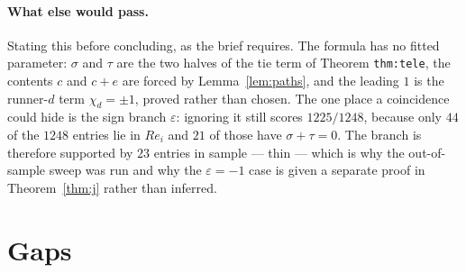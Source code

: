 \documentclass[11pt]{article}
\theoremstyle{definition}
\theoremstyle{remark}
\begin{document}
\paragraph{What else would pass.} Stating this before concluding, as the brief requires.
The formula has no fitted parameter: $\sigma$ and $\tau$ are the two halves of the tie
term of Theorem \texttt{thm:tele}, the contents $c$ and $c+e$ are forced by
Lemma~\ref{lem:paths}, and the leading $1$ is the runner-$d$ term $\chi_d=\pm1$, proved
rather than chosen. The one place a coincidence could hide is the sign branch
$\varepsilon$: ignoring it still scores $1225/1248$, because only $44$ of the $1248$
entries lie in $Re_i$ and $21$ of those have $\sigma+\tau=0$. The branch is therefore
supported by $23$ entries in sample --- thin --- which is why the out-of-sample sweep was
run and why the $\varepsilon=-1$ case is given a separate proof in
Theorem~\ref{thm:j} rather than inferred.

\section{Gaps}\label{sec:gaps}
\end{document}
